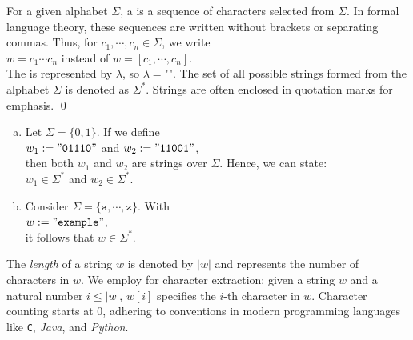 \begin{Definition}[Strings]
For a given alphabet \( \Sigma \), a   is a sequence of characters selected from \( \Sigma \). In formal language theory, these sequences are written without brackets or separating commas. Thus, for \( c_1, \cdots, c_n \in \Sigma \), we write
\\[0.2cm]
\hspace*{1.3cm}
\( w = c_1 \cdots c_n \) \quad instead of \quad \( w = [c_1, \cdots, c_n] \).
\\[0.2cm]
The  is represented by \( \lambda \), \index{\( \lambda \)} so \( \lambda = \texttt{""} \).
The set of all possible strings formed from the alphabet \( \Sigma \) is denoted as \( \Sigma^* \). \index{\( \Sigma^* \)} Strings are often enclosed in quotation marks for emphasis.
\qed
\end{Definition}
\vspace*{\fill}

\pagebreak

\vspace*{\fill}

\pagebreak

\examplesEng
\begin{enumerate}[(a)]
\item Let \( \Sigma = \{0, 1\} \).  If we define
      \\[0.2cm]
      \hspace*{1.3cm}
      \( w_1 := \mathtt{"01110"} \) and \( w_2 := \mathtt{"11001"} \),
      \\[0.2cm]
      then both \( w_1 \) and \( w_2 \) are strings over \( \Sigma \). Hence, we can state:
      \\[0.2cm]
      \hspace*{1.3cm}
      \( w_1 \in \Sigma^* \) and \( w_2 \in \Sigma^* \).
\item Consider \( \Sigma = \{\mathtt{a}, \cdots, \mathtt{z}\} \). With
      \\[0.2cm]
      \hspace*{1.3cm}
      \( w := \mathtt{"example"} \),
      \\[0.2cm]
      it follows that \( w \in \Sigma^* \). \eox
\end{enumerate}

The \emph{length} of a string \( w \) is denoted by \( |w| \) and represents the number of characters in \( w
\).  
We employ  for character extraction: given a string \( w \) and a natural number
\( i \leq |w| \), \( w[i] \) specifies the \( i \)-th character in \( w \). Character counting starts at 0, adhering to
conventions in modern programming languages like \texttt{C}, \textsl{Java}, and \textsl{Python}. 

